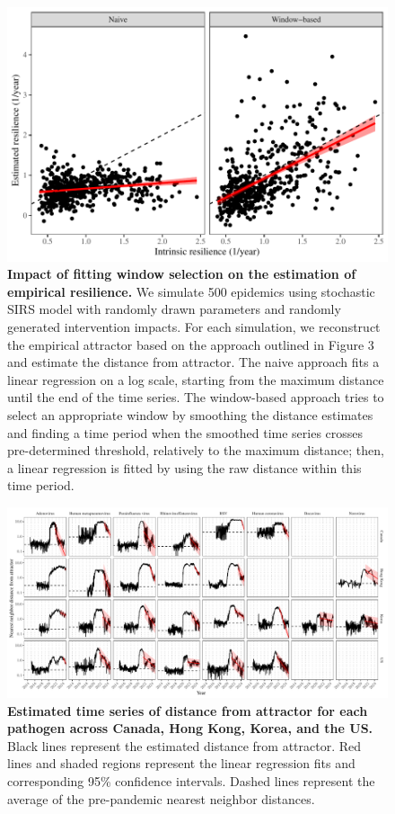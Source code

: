 \documentclass[12pt]{article}
\begin{document}
\pagebreak

\begin{figure}[!th]
\includegraphics[width=\textwidth]{../figure_analysis_random/figure_analysis_random.pdf}
\caption{
\textbf{Impact of fitting window selection on the estimation of empirical resilience.}
We simulate 500 epidemics using stochastic SIRS model with randomly drawn parameters and randomly generated intervention impacts.
For each simulation, we reconstruct the empirical attractor based on the approach outlined in Figure 3 and estimate the distance from attractor.
The naive approach fits a linear regression on a log scale, starting from the maximum distance until the end of the time series.
The window-based approach tries to select an appropriate window by smoothing the distance estimates and finding a time period when the smoothed time series crosses pre-determined threshold, relatively to the maximum distance;
then, a linear regression is fitted by using the raw distance within this time period.
}
\end{figure}

\pagebreak

\begin{figure}[!th]
\includegraphics[width=\textwidth]{../figure4/figure4_dist.pdf}
\caption{
\textbf{Estimated time series of distance from attractor for each pathogen across Canada, Hong Kong, Korea, and the US.}
Black lines represent the estimated distance from attractor.
Red lines and shaded regions represent the linear regression fits and corresponding 95\% confidence intervals.
Dashed lines represent the average of the pre-pandemic nearest neighbor distances.
}
\end{figure}
\end{document}
